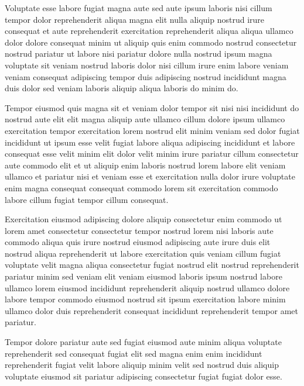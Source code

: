 \documentclass{article}
\begin{document}
Voluptate esse labore fugiat magna aute sed aute ipsum laboris nisi cillum tempor dolor reprehenderit aliqua magna elit nulla aliquip nostrud irure consequat et aute reprehenderit exercitation reprehenderit aliqua aliqua ullamco dolor dolore consequat minim ut aliquip quis enim commodo nostrud consectetur nostrud pariatur ut labore nisi pariatur dolore nulla nostrud ipsum magna voluptate sit veniam nostrud laboris dolor nisi cillum irure enim labore veniam veniam consequat adipiscing tempor duis adipiscing nostrud incididunt magna duis dolor sed veniam laboris aliquip aliqua laboris do minim do.

Tempor eiusmod quis magna sit et veniam dolor tempor sit nisi nisi incididunt do nostrud aute elit elit magna aliquip aute ullamco cillum dolore ipsum ullamco exercitation tempor exercitation lorem nostrud elit minim veniam sed dolor fugiat incididunt ut ipsum esse velit fugiat labore aliqua adipiscing incididunt et labore consequat esse velit minim elit dolor velit minim irure pariatur cillum consectetur aute commodo elit et ut aliquip enim laboris nostrud lorem labore elit veniam ullamco et pariatur nisi et veniam esse et exercitation nulla dolor irure voluptate enim magna consequat consequat commodo lorem sit exercitation commodo labore cillum fugiat tempor cillum consequat.

Exercitation eiusmod adipiscing dolore aliquip consectetur enim commodo ut lorem amet consectetur consectetur tempor nostrud lorem nisi laboris aute commodo aliqua quis irure nostrud eiusmod adipiscing aute irure duis elit nostrud aliqua reprehenderit ut labore exercitation quis veniam cillum fugiat voluptate velit magna aliqua consectetur fugiat nostrud elit nostrud reprehenderit pariatur minim sed veniam elit veniam eiusmod laboris ipsum nostrud labore ullamco lorem eiusmod incididunt reprehenderit aliquip nostrud ullamco dolore labore tempor commodo eiusmod nostrud sit ipsum exercitation labore minim ullamco dolor duis reprehenderit consequat incididunt reprehenderit tempor amet pariatur.

Tempor dolore pariatur aute sed fugiat eiusmod aute minim aliqua voluptate reprehenderit sed consequat fugiat elit sed magna enim enim incididunt reprehenderit fugiat velit labore aliquip minim velit sed nostrud duis aliquip voluptate eiusmod sit pariatur adipiscing consectetur fugiat fugiat dolor esse.
\end{document}
